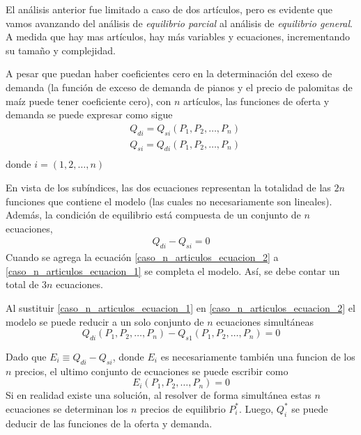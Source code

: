 El análisis anterior fue limitado a caso de dos artículos, pero es evidente que vamos avanzando del análisis de \textit{equilibrio parcial} al análisis de \textit{equilibrio general}. A medida que hay mas artículos, hay más variables y ecuaciones, incrementando su tamaño y complejidad. 

A pesar que puedan haber coeficientes cero en la determinación del exeso de demanda (la función de exceso de demanda de pianos y el precio de palomitas de maíz puede tener coeficiente cero), con \(n\) artículos, las funciones de oferta y demanda se puede expresar como sigue 
\begin{equation}
    \label{caso_n_articulos_ecuacion_1}
    \begin{aligned}
        & Q_{di}=Q_{si}(P_1,P_2,\dots,P_n) \\ 
        & Q_{si}=Q_{di}(P_1,P_2,\dots,P_n) \\
    \end{aligned}
\end{equation}
donde \(i=(1,2,\dots,n)\)

En vista de los subíndices, las dos ecuaciones representan la totalidad de las \(2n\) funciones que contiene el modelo (las cuales no necesariamente son lineales). Además, la condición de equilibrio está compuesta de un conjunto de \(n\) ecuaciones,
\begin{equation}
    \label{caso_n_articulos_ecuacion_2}
    \begin{aligned}
        Q_{di}-Q_{si}=0
    \end{aligned}
\end{equation}
Cuando se agrega la ecuación \ref{caso_n_articulos_ecuacion_2} a \ref{caso_n_articulos_ecuacion_1} se completa el modelo. Así, se debe contar un total de \(3n\) ecuaciones.

Al sustituir \ref{caso_n_articulos_ecuacion_1} en \ref{caso_n_articulos_ecuacion_2} el modelo se puede reducir a un solo conjunto de \(n\) ecuaciones simultáneas
\[
Q_{di}(P_1,P_2,\dots,P_n)-Q_{s1}(P_1,P_2,\dots,P_n)=0
\]

Dado que \(E_i \equiv Q_{di}-Q_{si}\), donde \(E_i\) es necesariamente también una funcion de los \(n\) precios, el ultimo conjunto de ecuaciones se puede escribir como 
\[
E_i(P_1,P_2,\dots,P_n)=0
\]
Si en realidad existe una solución, al resolver de forma simultánea estas \(n\) ecuaciones se determinan los \(n\) precios de equilibrio \(P_i^\ast\). Luego, \(Q_i^\ast\) se puede deducir de las funciones de la oferta y demanda.


